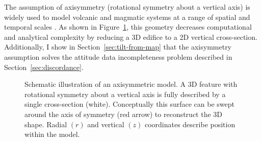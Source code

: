 
The assumption of axisymmetry (rotational symmetry about a vertical axis) is widely used to model volcanic and magmatic systems at a range of spatial and temporal scales \parencite[c.f.,][]{redmond_numerical_2004,ogawa_four-stage_2021,mogi_relations_1958,mctigue_elastic_1987}. As shown in Figure~\ref{fig:axisymmetry}, this geometry decreases computational and analytical complexity by reducing a 3D edifice to a 2D vertical cross-section. Additionally, I show in Section~\ref{sec:tilt-from-map} that the axisymmetry assumption solves the attitude data incompleteness problem described in Section~\ref{sec:discordance}.

\begin{figure}
    \caption[Axisymmetry]{Schematic illustration of an axisymmetric model. A 3D feature with rotational symmetry about a vertical axis is fully described by a single cross-section (white). Conceptually this surface can be swept around the axis of symmetry (red arrow) to reconstruct the 3D shape. Radial $(r)$ and vertical $(z)$ coordinates describe position within the model.}%
    \label{fig:axisymmetry}
\end{figure}